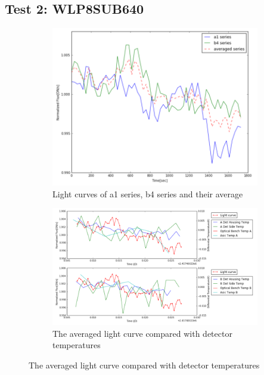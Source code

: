 \documentclass[conference]{IEEEtran}
\begin{document}
\subsection{Test 2: WLP8SUB640} 
\begin{figure}[H]
    \centering
    \begin{subfigure}{1}
        \includegraphics[scale=0.4]{ts_test2}
        \caption{Light curves of a1 series, b4 series and their average}
    \end{subfigure}

    \begin{subfigure}{2}
        \includegraphics[scale=0.4]{temp_test2}
        \caption{The averaged light curve compared with detector temperatures}
    \end{subfigure}
   

\end{figure}
\end{document}

